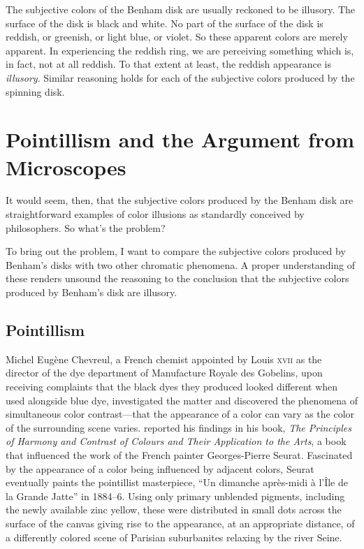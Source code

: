 \documentclass[12pt]{article}
\begin{document}
The subjective colors of the Benham disk are usually reckoned to be illusory. The surface of the disk is black and white. No part of the surface of the disk is reddish, or greenish, or light blue, or violet. So these apparent colors are merely apparent. In experiencing the reddish ring, we are perceiving something which is, in fact, not at all reddish. To that extent at least, the reddish appearance is \emph{illusory}. Similar reasoning holds for each of the subjective colors produced by the spinning disk.

\section{Pointillism and the Argument from Microscopes}\label{sec:pointillism_and_the_argument_from_microscopes} %

It would seem, then, that the subjective colors produced by the Benham disk are straightforward examples of color illusions as standardly conceived by philosophers. So what's the problem?

To bring out the problem, I want to compare the subjective colors produced by Benham's disks with two other chromatic phenomena. A proper understanding of these renders unsound the reasoning to the conclusion that the subjective colors produced by Benham's disk are illusory.


\subsection{Pointillism}\label{sub:pointillism} %

Michel Eugène Chevreul, a French chemist appointed by Louis \textsc{xvii} as the director of the dye department of Manufacture Royale des Gobelins, upon receiving complaints that the black dyes they produced looked different when used alongside blue dye, investigated the matter and discovered the phenomena of simultaneous color contrast---that the appearance of a color can vary as the color of the surrounding scene varies. \citet{Chevreul:1855kx} reported his findings in his book, \emph{The Principles of Harmony and Contrast of Colours and Their Application to the Arts}, a book that influenced the work of the French painter Georges-Pierre Seurat. Fascinated by the appearance of a color being influenced by adjacent colors, Seurat eventually paints the pointillist masterpiece, “Un dimanche après-midi à l'Île de la Grande Jatte” in 1884--6. Using only primary unblended pigments, including the newly available zinc yellow, these were distributed in small dots across the surface of the canvas giving rise to the appearance, at an appropriate distance, of a differently colored scene of Parisian suburbanites relaxing by the river Seine.
\end{document}
